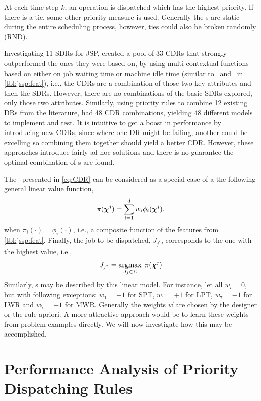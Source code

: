 \documentclass[smallextended]{svjour3}
\begin{document}
At each time step $k$, an operation is dispatched which has the highest 
priority.  If there is a tie, some other priority measure is used. Generally 
the \dr s are static during the entire scheduling process, however, ties could 
also be broken randomly (RND). 

Investigating 11 SDRs for JSP, \cite{Lu13} created a pool of 33 CDRs that 
strongly outperformed the ones they were based on, by using multi-contextual 
functions based on either on job waiting time or machine idle time 
(similar to \phiwait\ and \phimacSlack\ in \cref{tbl:jssp:feat}), i.e., the 
CDRs are a combination of those two key attributes and then the SDRs. 
However, there are no combinations of the basic SDRs explored, only those two 
attributes.  
Similarly, using priority rules to combine 12 existing DRs from the literature, 
\cite{Yu13} had 48 CDR combinations, yielding 48 different models 
to implement and test. 
It is intuitive to get a boost in performance by introducing new CDRs, since 
where one DR might be failing, another could be excelling so combining them 
together should yield a better CDR. However, these approaches introduce fairly 
ad-hoc solutions and there is no guarantee the optimal combination of 
\dr s are found.

The \cdr\ presented in \cref{eq:CDR} can be considered as a special case of a 
the following general linear value function,
\begin{equation}\label{eq:jssp:linweights}
	\pi(\bm \chi^j)=\sum_{i=1}^d w_i \phi_i(\bm \chi^j).
\end{equation}
when $\pi_i(\cdot)=\phi_i(\cdot)$, i.e., a composite function of the features 
from \cref{tbl:jssp:feat}. Finally, the job to be dispatched, $J_{j^*}$, 
corresponds to the one with the highest value, i.e.,
\begin{equation}\label{eq:jstar}
	J_{j^*}=\mathop{\rm argmax}_{J_j\in \mathcal{L}}\; \pi(\bm \chi^j)
\end{equation}
Similarly, \sdr s may be described by this linear model. For instance, let all 
$w_i=0$, but with following exceptions: $w_1=-1$ for SPT, $w_1=+1$ for LPT, 
$w_7=-1$ for LWR and $w_7=+1$ for MWR. Generally the weights $\vec{w}$ are 
chosen by the designer or the 
rule apriori.  A more attractive approach would be to learn these weights from 
problem examples directly. We will now investigate how this may be accomplished.

\section{Performance Analysis of Priority Dispatching Rules}\label{sec:learnOPT}
\end{document}
